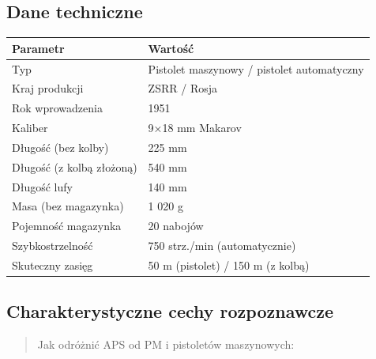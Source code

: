 \documentclass[12pt,oneside]{book}
\begin{document}
\subsection{Dane techniczne}\label{dane-techniczne-103}

\begin{longtable}[]{@{}ll@{}}
\toprule\noalign{}
Parametr & Wartość \\
\midrule\noalign{}
\endhead
\bottomrule\noalign{}
\endlastfoot
Typ & Pistolet maszynowy / pistolet automatyczny \\
Kraj produkcji & ZSRR / Rosja \\
Rok wprowadzenia & 1951 \\
Kaliber & 9×18 mm Makarov \\
Długość (bez kolby) & 225 mm \\
Długość (z kolbą złożoną) & 540 mm \\
Długość lufy & 140 mm \\
Masa (bez magazynka) & 1 020 g \\
Pojemność magazynka & 20 nabojów \\
Szybkostrzelność & 750 strz./min (automatycznie) \\
Skuteczny zasięg & 50 m (pistolet) / 150 m (z kolbą) \\
\end{longtable}

\subsection{Charakterystyczne cechy
rozpoznawcze}\label{charakterystyczne-cechy-rozpoznawcze-103}

\begin{quote}
Jak odróżnić APS od PM i pistoletów maszynowych:
\end{quote}
\end{document}
